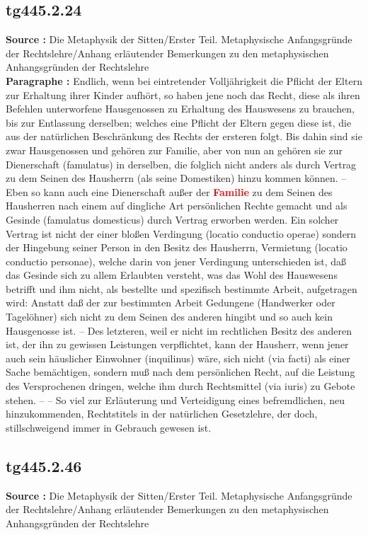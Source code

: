 \documentclass[a4paper,12pt,twoside]{book}
\newcommand{\match}[1]{\textcolor{red}{\textbf{#1}}}
\begin{document}
	\subsection*{tg445.2.24} 
	\textbf{Source : }Die Metaphysik der Sitten/Erster Teil. Metaphysische Anfangsgründe der Rechtslehre/Anhang erläutender Bemerkungen zu den metaphysischen Anhangsgründen der Rechtslehre\\  
	
	\textbf{Paragraphe : }Endlich, wenn bei eintretender Volljährigkeit die Pflicht der Eltern zur Erhaltung ihrer Kinder aufhört, so haben jene noch das Recht, diese als ihren Befehlen unterworfene Hausgenossen zu Erhaltung des Hauswesens zu brauchen, bis zur Entlassung derselben; welches eine Pflicht der Eltern gegen diese ist, die aus der natürlichen Beschränkung des Rechts der ersteren folgt. Bis dahin sind sie zwar Hausgenossen und gehören zur Familie, aber von nun an gehören sie zur Dienerschaft (famulatus) in derselben, die folglich nicht anders als durch Vertrag zu dem Seinen des Hausherrn (als seine Domestiken) hinzu kommen können. – Eben so kann auch eine Dienerschaft 
	außer der \match{Familie} zu dem Seinen des Hausherren nach einem auf dingliche Art persönlichen Rechte gemacht und als Gesinde (famulatus domesticus) durch Vertrag erworben werden. Ein solcher Vertrag ist nicht der einer bloßen Verdingung (locatio conductio operae) sondern der Hingebung seiner Person in den Besitz des Hausherrn, Vermietung (locatio conductio personae), welche darin von jener Verdingung unterschieden ist, daß das Gesinde sich zu allem Erlaubten versteht, was das Wohl des Hauswesens betrifft und ihm nicht, als bestellte und spezifisch bestimmte Arbeit, aufgetragen wird: Anstatt daß der zur bestimmten Arbeit Gedungene (Handwerker oder Tagelöhner) sich nicht zu dem Seinen des anderen hingibt und so auch kein Hausgenosse ist. – Des letzteren, weil er nicht im rechtlichen Besitz des anderen ist, der ihn zu gewissen Leistungen verpflichtet, kann der Hausherr, wenn jener auch sein häuslicher Einwohner (inquilinus) wäre, sich nicht (via facti) als einer Sache bemächtigen, sondern muß nach dem persönlichen Recht, auf die Leistung des Versprochenen dringen, welche ihm durch Rechtsmittel (via iuris) zu Gebote stehen. – – So viel zur Erläuterung und Verteidigung eines befremdlichen, neu hinzukommenden, Rechtstitels in der natürlichen Gesetzlehre, der doch, stillschweigend immer in Gebrauch gewesen ist. 
	
	\subsection*{tg445.2.46} 
	\textbf{Source : }Die Metaphysik der Sitten/Erster Teil. Metaphysische Anfangsgründe der Rechtslehre/Anhang erläutender Bemerkungen zu den metaphysischen Anhangsgründen der Rechtslehre\\  
	
\end{document}
